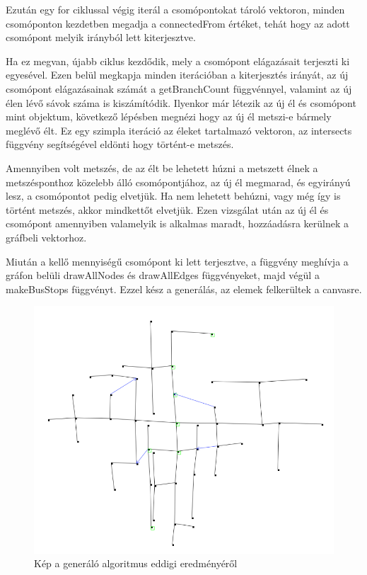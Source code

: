 Ezután egy for ciklussal végig iterál a csomópontokat tároló vektoron, minden csomóponton kezdetben megadja a connectedFrom értéket, tehát hogy az adott csomópont melyik irányból lett kiterjesztve. 

Ha ez megvan, újabb ciklus kezdődik, mely a csomópont elágazásait terjeszti ki egyesével. Ezen belül megkapja minden iterációban a kiterjesztés irányát, az új csomópont elágazásainak számát a getBranchCount függvénnyel, valamint az új élen lévő sávok száma is kiszámítódik. Ilyenkor már létezik az új él és csomópont mint objektum, következő lépésben megnézi hogy az új él metszi-e bármely meglévő élt. Ez egy szimpla iteráció az éleket tartalmazó vektoron, az intersects függvény segítségével eldönti hogy történt-e metszés.

Amennyiben volt metszés, de az élt be lehetett húzni a metszett élnek a metszésponthoz közelebb álló csomópontjához, az új él megmarad, és egyirányú lesz, a csomópontot pedig elvetjük. Ha nem lehetett behúzni, vagy még így is történt metszés, akkor mindkettőt elvetjük. Ezen vizsgálat után az új él és csomópont amennyiben valamelyik is alkalmas maradt, hozzáadásra kerülnek a gráfbeli vektorhoz.

Miután a kellő mennyiségű csomópont ki lett terjesztve, a függvény meghívja a gráfon belüli drawAllNodes és drawAllEdges függvényeket, majd végül a makeBusStops függvényt. Ezzel kész a generálás, az elemek felkerültek a canvasre.
\begin{figure}[H]
\includegraphics[width=\linewidth]{graph.png}
\caption{Kép a generáló algoritmus eddigi eredményéről}
\label{fig:graph}
\end{figure}
